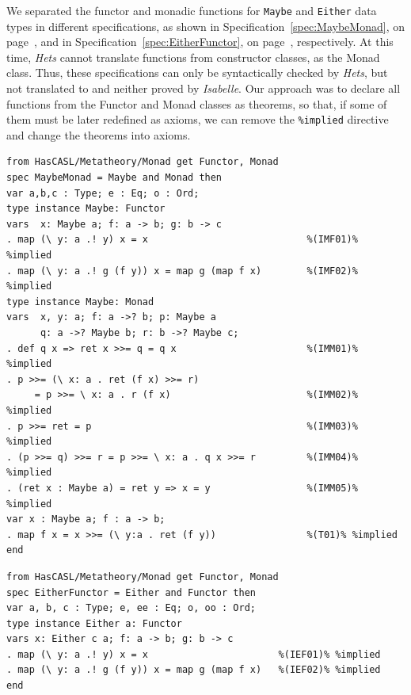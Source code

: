 \documentclass[12pt,twoside]{article}
\numberwithin{spec}{subsection}
\numberwithin{proof}{subsection}
\numberwithin{figure}{subsection}
\numberwithin{code}{subsection}
\newcommand{\citeSpec}[1]{Specification~\ref{#1}, on page~\pageref{#1}}
\begin{document}
We separated the functor and monadic functions for \verb.Maybe. and \verb.Either. data types in different specifications, as shown in \citeSpec{spec:MaybeMonad}, and in \citeSpec{spec:EitherFunctor}, respectively. At this time, \textit{Hets} cannot translate functions from constructor classes, as the Monad class. Thus, these specifications can only be syntactically checked by \textit{Hets}, but not translated to and neither proved by \textit{Isabelle}. Our approach was to declare all functions from the Functor and Monad classes as theorems, so that, if some of them must be later redefined as axioms, we can remove the \verb.%implied. directive and change the theorems into axioms.

\begin{spec}[ht!]\capstart
\begin{verbatim}
from HasCASL/Metatheory/Monad get Functor, Monad
spec MaybeMonad = Maybe and Monad then
var a,b,c : Type; e : Eq; o : Ord;
type instance Maybe: Functor
vars  x: Maybe a; f: a -> b; g: b -> c
. map (\ y: a .! y) x = x                            %(IMF01)% %implied
. map (\ y: a .! g (f y)) x = map g (map f x)        %(IMF02)% %implied
type instance Maybe: Monad
vars  x, y: a; f: a ->? b; p: Maybe a
      q: a ->? Maybe b; r: b ->? Maybe c;
. def q x => ret x >>= q = q x                       %(IMM01)% %implied
. p >>= (\ x: a . ret (f x) >>= r)
     = p >>= \ x: a . r (f x)                        %(IMM02)% %implied
. p >>= ret = p                                      %(IMM03)% %implied
. (p >>= q) >>= r = p >>= \ x: a . q x >>= r         %(IMM04)% %implied
. (ret x : Maybe a) = ret y => x = y                 %(IMM05)% %implied
var x : Maybe a; f : a -> b;
. map f x = x >>= (\ y:a . ret (f y))                %(T01)% %implied
end
\end{verbatim}
\caption{MaybeMonad Specification}
\label{spec:MaybeMonad}
\end{spec}

\begin{spec}[hb!]\capstart
\begin{verbatim}
from HasCASL/Metatheory/Monad get Functor, Monad
spec EitherFunctor = Either and Functor then
var a, b, c : Type; e, ee : Eq; o, oo : Ord;
type instance Either a: Functor
vars x: Either c a; f: a -> b; g: b -> c
. map (\ y: a .! y) x = x                       %(IEF01)% %implied
. map (\ y: a .! g (f y)) x = map g (map f x)   %(IEF02)% %implied
end
\end{verbatim}
\caption{EitherFunctor Specification}
\label{spec:EitherFunctor}
\end{spec}
\end{document}
